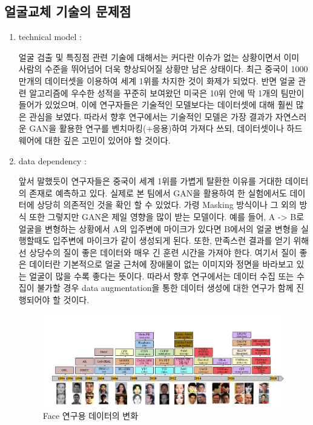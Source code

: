 \documentclass[chapter,oneside]{oblivoir}
\begin{document}
\subsection{얼굴교체 기술의 문제점}
\begin{enumerate}
    \item technical model : 

    얼굴 검출 및 특징점 관련 기술에 대해서는 커다란 이슈가 없는 상황이면서 이미 사람의 수준을 뛰어넘어 더욱 향상되어질 상황만 남은 상태이다. 최근 중국이 1000만개의 데이터셋을 이용하여 세계 1위를 차지한 것이 화제가 되었다. 반면 얼굴 관련 알고리즘에 우수한 성적을 꾸준히 보여왔던 미국은 10위 안에 딱 1개의 팀만이 들어가 있었으며, 이에 연구자들은 기술적인 모델보다는 데이터셋에 대해 훨씬 많은 관심을 보였다. 따라서 향후 연구에서는 기술적인 모델은 가장 결과가 자연스러운 GAN을 활용한 연구를 벤치마킹(+응용)하여 가져다 쓰되, 데이터셋이나 하드웨어에 대한 깊은 고민이 있어야 할 것이다.

    \item data dependency : 

    앞서 말했듯이 연구자들은 중국이 세계 1위를 가볍게 탈환한 이유를 거대한 데이터의 존재로 예측하고 있다. 실제로 본 팀에서 GAN을 활용하여 한 실험에서도 데이터에 상당히 의존적인 것을 확인 할 수 있었다. 가령 Masking 방식이나 그 외의 방식 또한 그렇지만 GAN은 제일 영향을 많이 받는 모델이다. 예를 들어, A -> B로 얼굴을 변형하는 상황에서 A의 입주변에 마이크가 있다면 B에서의 얼굴 변형을 실행할때도 입주변에 마이크가 같이 생성되게 된다. 또한, 만족스런 결과를 얻기 위해선 상당수의 질이 좋은 데이터와 매우 긴 훈련 시간을 가져야 한다. 여기서 질이 좋은 데이터란 기본적으로 얼굴 근처에 장애물이 없는 이미지와 정면을 바라보고 있는 얼굴이 많을 수록 좋다는 뜻이다. 따라서 향후 연구에서는 데이터 수집 또는 수집이 불가할 경우 data augmentation을 통한 데이터 생성에 대한 연구가 함께 진행되어야 할 것이다.

    \begin{figure}[h!]
        \centering
          \includegraphics[scale = 0.8]{pic/chp1/img669}
        \caption{Face 연구용 데이터의 변화 \cite{reference6}}
    \end{figure}


\end{enumerate}
\end{document}
